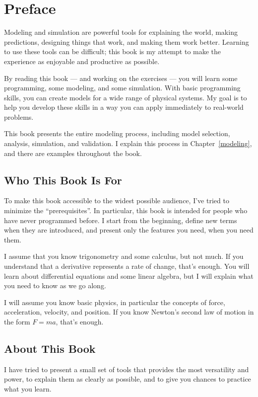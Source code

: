 \chapter*{Preface}
\adjustmtc

Modeling and simulation are powerful tools for explaining the world, making predictions, designing things that work, and making them work better.  Learning to use these tools can be difficult; this book is my attempt to make the experience as enjoyable and productive as possible.

By reading this book --- and working on the exercises --- you will learn some programming, some modeling, and some simulation.
With basic programming skills, you can create models for a wide range of physical systems.
My goal is to help you develop these skills in a way you can apply immediately to real-world problems.

This book presents the entire modeling process, including model selection, analysis, simulation, and validation.  I explain this process in Chapter~\ref{modeling}, and there are examples throughout the book.

\section{Who This Book Is For}

To make this book accessible to the widest possible audience, I've tried to minimize the ``prerequisites''.  
In particular, this book is intended for people who have never programmed before.  I start from the beginning, define new terms when they are introduced, and present only the features you need, when you need them.

I assume that you know trigonometry and some calculus, but not much.  If you understand that a derivative represents a rate of change, that's enough.  You will learn about differential equations and some linear algebra, but I will explain what you need to know as we go along.

I will assume you know basic physics, in particular the concepts of force, acceleration, velocity, and position.  If you know Newton's second law of motion in the form $F = m a$, that's enough.

\section{About This Book}

I have tried to present a small set of tools that provides the most versatility and power, to explain them as clearly as possible, and to give you chances to practice what you learn.

